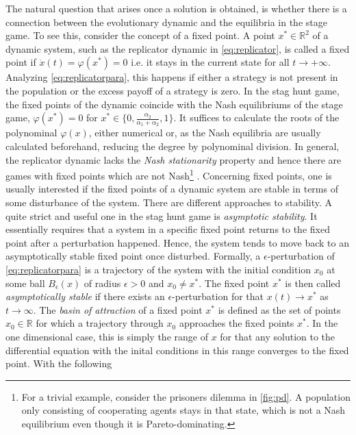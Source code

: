 \documentclass[11pt]{article}
\newcommand{\realnumb}{\mathbb{R}}
\begin{document}
The natural question that arises once a solution is obtained, is whether there 
is a connection between the evolutionary dynamic and the equilibria in the 
stage game. To see this, consider the concept of a fixed point.
A point $x^* \in \realnumb^2$ of a dynamic system, such as the replicator 
dynamic in \eqref{eq:replicator}, is called a fixed point
if $\dot{x}(t) = \varphi(x^*) = 0$ i.e. it stays in the current state for all 
$t \rightarrow + \infty $. 
Analyzing \eqref{eq:replicatorpara}, this happens if either a strategy
is not present in the population or the excess payoff of a strategy is zero. 
In the stag hunt game, the fixed points of the
dynamic coincide with the Nash equilibriums of the stage game, 
$\varphi(x^*) = 0$ for $x^* \in \{0,\frac{\alpha_2}{\alpha_1+\alpha_2},1\}$. 
It suffices to calculate the roots of the polynominal $\varphi(x)$, either
numerical or, as the Nash equilibria are usually calculated beforehand,
reducing the degree by polynominal division. In general, the replicator 
dynamic lacks the \textit{Nash stationarity} property and hence there are 
games with fixed points which are not Nash\footnote{For a trivial example, 
consider the prisoners dilemma in \ref{fig:pd}. A population only consisting of 
cooperating agents stays in that state, which is not a Nash equilibrium even 
though it is Pareto-dominating.} \parencite{sandholm_population_2010}.
Concerning fixed points, one is usually interested if the fixed points of 
a dynamic system are stable in terms of some disturbance of the system. 
There are different approaches to stability. A quite strict and useful one 
in the stag hunt game is \textit{asymptotic stability}. 
It essentially requires that a system in a specific fixed point returns 
to the fixed point after a perturbation happened.
Hence, the system tends to move back to an asymptotically stable fixed point
once disturbed. Formally, a $\epsilon$-perturbation of 
\eqref{eq:replicatorpara} is a trajectory of the system with the initial
condition $x_0$ at some ball $B_\epsilon(x)$ of radius $\epsilon >0$ and 
$x_0 \neq x^*$. The fixed point $x^*$ is then called \textit{asymptotically
stable} if there exists an $\epsilon$-perturbation for that $x(t) \rightarrow
x^*$ as $t \rightarrow \infty$. 
The \textit{basin of attraction} of a fixed point $x^*$ is defined as the set 
of points $x_0 \in \realnumb$ for which a trajectory through $x_0$ approaches 
the fixed points $x^*$. In the one dimensional case, this is simply the range 
of $x$ for that any solution to the differential equation with the inital 
conditions in this range converges to the fixed point. With the following 
\end{document}
